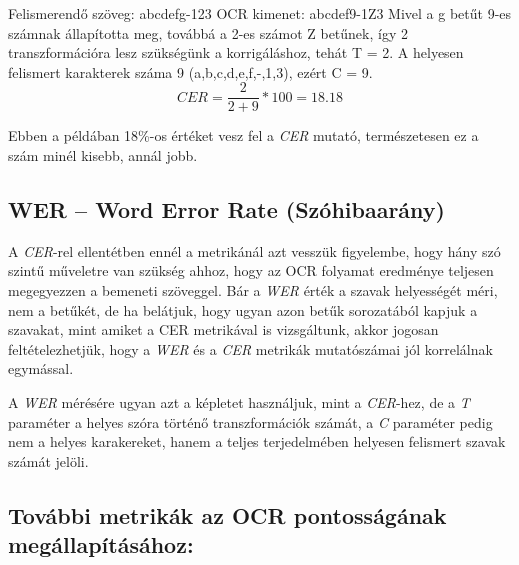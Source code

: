 \documentclass[12pt]{report}
\begin{document}
\begin{tcolorbox}
    Felismerendő szöveg: abcdefg-123
    \newline
    OCR kimenet: abcdef9-1Z3
    \newline
    Mivel a g betűt 9-es számnak állapította meg, továbbá a 2-es számot Z betűnek, így 2 transzformációra lesz szükségünk a korrigáláshoz, tehát T = 2.
    \newline
    A helyesen felismert karakterek száma 9 (a,b,c,d,e,f,-,1,3), ezért C = 9.
    \[CER = \frac{2}{2+9} * 100 = 18.18\]
\end{tcolorbox}

Ebben a példában 18\%-os értéket vesz fel a \emph{CER} mutató, természetesen ez a szám minél kisebb, annál jobb.

\subsection{WER – Word Error Rate (Szóhibaarány)}

A \emph{CER}-rel ellentétben ennél a metrikánál azt vesszük figyelembe, hogy hány szó szintű műveletre van szükség ahhoz, hogy az OCR folyamat eredménye teljesen megegyezzen a bemeneti szöveggel. Bár a \emph{WER} érték a szavak helyességét méri, nem a betűkét, de ha belátjuk, hogy ugyan azon betűk sorozatából kapjuk a szavakat, mint amiket a CER metrikával is vizsgáltunk, akkor jogosan feltételezhetjük, hogy a \emph{WER} és a \emph{CER} metrikák mutatószámai jól korrelálnak egymással.

A \emph{WER} mérésére ugyan azt a képletet használjuk, mint a \emph{CER}-hez, de a \emph{T} paraméter a helyes szóra történő transzformációk számát, a \emph{C} paraméter pedig nem a helyes karakereket, hanem a teljes terjedelmében helyesen felismert szavak számát jelöli.

\pagebreak
\subsection{További metrikák az OCR pontosságának megállapításához:}
\end{document}
